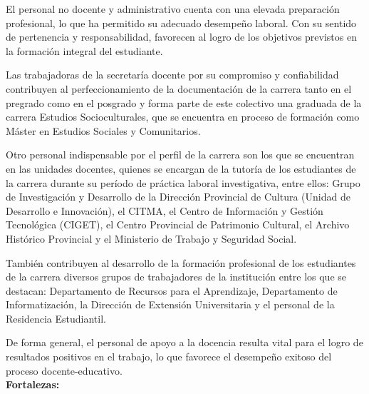 El personal no docente y administrativo cuenta con una elevada preparación profesional, lo que ha permitido su adecuado desempeño laboral. Con su sentido de pertenencia y responsabilidad, favorecen al logro de los objetivos previstos en la formación integral del estudiante. 

Las trabajadoras de la secretaría docente por su compromiso y confiabilidad contribuyen al perfeccionamiento de la documentación de la carrera tanto en el pregrado como en el posgrado y forma parte de este colectivo una graduada de la carrera Estudios Socioculturales, que se encuentra en proceso de formación como Máster en Estudios Sociales y Comunitarios.

Otro personal indispensable por el perfil de la carrera son los que se encuentran en las unidades docentes, quienes se encargan de la tutoría de los estudiantes de la carrera durante su período de práctica laboral investigativa, entre ellos: Grupo de Investigación y Desarrollo de la Dirección Provincial de Cultura (Unidad de Desarrollo e Innovación), el CITMA, el Centro de Información y Gestión Tecnológica (CIGET), el Centro Provincial de Patrimonio Cultural, el Archivo Histórico Provincial y el Ministerio de Trabajo y Seguridad Social.

También contribuyen al desarrollo de la formación profesional de los estudiantes de la carrera diversos grupos de trabajadores de la institución entre los que se destacan: Departamento de Recursos para el Aprendizaje, Departamento de Informatización, la Dirección de Extensión Universitaria y el personal de la Residencia Estudiantil.

De forma general, el personal de apoyo a la docencia resulta vital para el logro de resultados positivos en el trabajo, lo que favorece el desempeño exitoso del proceso docente-educativo.\\

\textbf{Fortalezas:}

